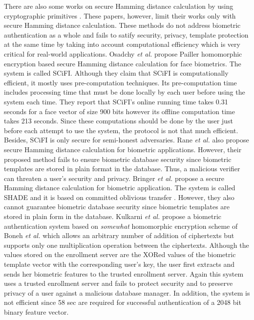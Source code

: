 \documentclass[journal]{IEEEtran}
\begin{document}
There are also some works on secure Hamming distance calculation by using cryptographic primitives \cite{Osadchy, Rane, BringerCP13, Kulkarni}. These papers, however, limit their works only with secure Hamming distance calculation. These methods do not address biometric authentication as a whole and fails to satify security, privacy, template protection at the same time by taking into account computational efficiency which is very critical for real-world applications. Osadchy \textit {et al.} \cite{Osadchy} propose Pailler homomorphic encryption based secure Hamming distance calculation for face biometrics. The system is called SCiFI. Although they claim that SCiFI is computationally efficient, it mostly uses pre-computation techniques. Its pre-computation time includes processing time that must be done locally by each user before using the system each time. They report that SCiFI's online running time takes 0.31 seconds for a face vector of size 900 bits however its offline computation time takes 213 seconds. Since these computations should be done by the user just before each attempt to use the system, the protocol is not that much efficient. Besides, SCiFI is only secure for semi-honest adversaries. Rane \textit {et al.} \cite{Rane} also propose secure Hamming distance calculation for biometric applications. However, their proposed method fails to ensure biometric database security since biometric templates are stored in plain format in the database. Thus, a malicious verifier can threaten a user's security and privacy. Bringer \textit {et al.} \cite{BringerCP13} propose a secure Hamming distance calculation for biometric application. The system is called SHADE and it is based on committed oblivious transfer \cite{KSV06}. However, they also cannot guarantee biometric database security since biometric templates are stored in plain form in the database. Kulkarni \textit {et al.} \cite{Kulkarni} propose a biometric authentication system based on \textit{somewhat} homomorphic encryption scheme of  Boneh \textit{et al.}\cite{BGN06} which allows an arbitrary number of addition of ciphertexts but supports only one multiplication operation between the ciphertexts. Although the values stored on the enrollment server are the XORed values of the biometric template vector with the corresponding user's key, the user first extracts and sends her biometric features to the trusted enrollment server. Again this system uses a trusted enrollment server and fails to protect security and to preserve privacy of a user against a malicious database manager. In addition, the system is not efficient since 58 sec are required for successful authentication of a 2048 bit binary feature vector.
\end{document}
